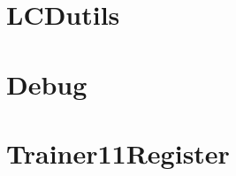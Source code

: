     \section{LCDutils}
        
    \newpage
    \section{Debug}
          
    \newpage
    \section{Trainer11Register}
        
